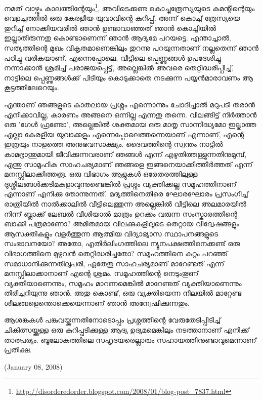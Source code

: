 \vskip 2pt

നമത് വാഴ്വും കാലത്തിന്റേയും\footnote{\url{http://disorderedorder.blogspot.com/2008/01/blog-post_7837.html}}, 
അവിടെക്കണ്ട കൊച്ചുത്രേസ്യയുടെ കമന്റിന്റെയും വെളച്ചത്തില്‍ ഒരു കേരളീയ യുവാവിന്റെ കുറിപ്പ്. 
അന്ന് കൊച്ച് ത്രേസ്യയെ തുറിച്ച് നോക്കിയവരില്‍ ഞാന്‍ ഉണ്ടാവാഞ്ഞത് ഞാന്‍ കൊച്ചിയില്‍ ഇല്ലാതിരുന്നതു 
കൊണ്ടാണെന്ന് ഞാന്‍ ആദ്യമേ പറയട്ടെ. എന്താച്ചാല്‍, സത്യത്തിന്റെ മുഖം വികൃതമാണെങ്കിലും 
തുറന്നു പറയുന്നതാണ് നല്ലതെന്ന് ഞാന്‍ പഠിച്ചു വരികയാണ്. എന്നെപ്പോലെ, വീട്ടിലെ പ്പെണ്ണുങ്ങള്‍ ഉപദേശിച്ചു 
നന്നാക്കാന്‍ ശ്രമിച്ച് പരാജയപ്പെട്ട്, അല്ലെങ്കില്‍ അവരെ തെറ്റിദ്ധരിപ്പിച്ച്, നാട്ടിലെ പ്പെണ്ണുങ്ങള്‍ക്ക് പിടിയും കൊടുക്കാതെ 
നടക്കുന്ന പയ്യന്‍മാരാവണം ആ കൂട്ടത്തിലേറെയും.

എന്താണ് ഞങ്ങളുടെ കാതലായ പ്രശ്നം എന്നൊന്നും ചോദിച്ചാല്‍ മറുപടി തരാന്‍ എനിക്കാവില്ല, കാരണം അങ്ങനെ ഒന്നില്ല 
എന്നതു തന്നെ. വിലങ്ങിട്ട് നിര്‍ത്താന്‍ ഒരു 'ഗേള്‍ ഫ്രണ്ടോ', അല്ലെങ്കില്‍ ശക്തമായ ഒരു മാതൃ സാന്നിദ്ധ്യമോ ഇല്ലാത്ത എല്ലാ 
കേരളീയ യുവാക്കളും എന്നെപ്പോലെത്തന്നെയാണ് എന്നാണ്, എന്റെ ഇത്രയും നാളത്തെ അനുഭവസാക്ഷ്യം. ദൈവത്തിന്റെ 
സ്വന്തം നാട്ടില്‍ കാമഭ്രാന്തുമായി ജീവിക്കുന്നവരാണ് ഞങ്ങള്‍ എന്ന് എഴുതിത്തള്ളുന്നതിനുമുമ്പ്, എന്തു സാമൂഹിക സാഹചര്യമാണ് 
ഞങ്ങളെ ഇങ്ങനെയാക്കിത്തീര്‍ത്തത് എന്ന് മനസ്സിലാക്കിത്തരൂ. ഒരു വിഭാഗം ആളുകള്‍ ഒരേതരത്തിലുള്ള 
ദുശ്ശീലങ്ങള്‍ക്കടിമകളാവുന്നുണ്ടെങ്കില്‍ പ്രശ്നം വ്യക്തിക്കല്ല സമൂഹത്തിനാണ് എന്നാണ് എനിക്കു തോന്നുന്നത്. 
മദ്യത്തിനെതിരെ ഘോരഘോരം പ്രസംഗിച്ച് രാത്രിയില്‍ നാല്‍ക്കാലില്‍ വീട്ടിലെത്തുന്ന അല്ലെങ്കില്‍ വീട്ടിലെ അലമാരയില്‍ 
നിന്ന് ബ്ലാക്ക് ലേബല്‍ വീശിയാല്‍ മാത്രം ഉറക്കം വരുന്ന സംസ്കാരത്തിന്റെ ബാക്കി പത്രമാണോ? അമിതമായ 
വിലക്കുകളിലൂടെ തെറ്റായ വിദ്വേഷങ്ങളും ആസക്തികളും വളര്‍ത്തുന്ന ആത്മീയ വിദ്യാഭ്യാസ സ്ഥാപനങ്ങളുടെ 
സംഭാവനയോ? അതോ, എതിര്‍ലിംഗത്തിലെ ന്യൂനപക്ഷത്തിനെക്കണ്ട് ഒരു വിഭാഗത്തിനെ മുഴുവന്‍ തെറ്റിദ്ധരിച്ചതോ? 
സമൂഹത്തിനെ കുറ്റം പറഞ്ഞ് സമാധാനിക്കുന്നതിലുപരി, ഏതേതു സാഹചര്യമാണ് മാറേണ്ടത് എന്ന് മനസ്സിലാക്കാനാണ് 
എന്റെ ശ്രമം. സമൂഹത്തിന്റെ നെടുംതൂണ് വ്യക്തിയാണെന്നും, സമൂഹം മാറണമെങ്കില്‍ മാറേണ്ടത് 
വ്യക്തിയാണെന്നും തിരിച്ചറിയുന്നു ഞാന്‍. അതു കൊണ്ട്, ഒരു വ്യക്തിയെന്ന നിലയില്‍ മാറ്റേണ്ട 
ശീലങ്ങളെന്തൊക്കെയെന്നാണ് ഞാന്‍ അന്വേഷിക്കുന്നതും.

ആശങ്കകള്‍ പങ്കുവയ്ക്കുന്നതിനോടൊപ്പം പ്രശ്നത്തിന്റെ വേരുതേടിപ്പിടിച്ച് ചികിത്സയ്ക്കുള്ള ഒരു കുറിപ്പടിക്കുള്ള ആദ്യ 
ഉദ്യമമെങ്കിലും നടത്താനാണ് എനിക്ക് താത്പര്യം. ബൂലോകത്തിലെ സഹൃദയരെല്ലാരും സഹായത്തിനുണ്ടാവുമെന്നാണ് പ്രതീക്ഷ.

(January 08, 2008)
\newpage
